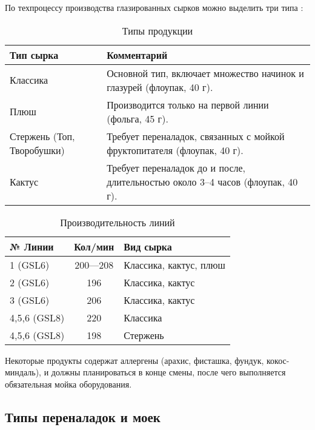 По техпроцессу производства глазированных сырков можно выделить три типа :
\begin{table}[h]
\centering
\caption{Типы продукции}
\begin{tabularx}{\textwidth}{|l|X|}
\hline
\textbf{Тип сырка} & \textbf{Комментарий} \\
\hline
Классика                   & Основной тип, включает множество начинок и глазурей (флоупак, 40 г). \\
\hline
Плюш                       & Производится только на первой линии (фольга, 45 г). \\
\hline
Стержень (Топ, Творобушки) & Требует переналадок, связанных с мойкой фруктопитателя (флоупак, 40 г). \\
\hline
Кактус                     & Требует переналадок до и после, длительностью около 3--4 часов (флоупак, 40 г). \\
\hline
\end{tabularx}
\end{table}

\begin{table}[h]
\centering
\caption{Производительность линий}
\begin{tabularx}{\textwidth}{|l|c|X|}
\hline
\textbf{№ Линии} & \textbf{ Кол/мин} & \textbf{Вид сырка} \\
\hline
1 (GSL6)     & 200—208 & Классика, кактус, плюш \\
\hline
2 (GSL6)     & 196     & Классика, кактус \\
\hline
3 (GSL6)     & 206     & Классика, кактус \\
\hline
4,5,6 (GSL8) & 220     & Классика \\
\hline
4,5,6 (GSL8) & 198     & Стержень \\
\hline
\end{tabularx}
\end{table}

Некоторые продукты содержат аллергены (арахис, фисташка, фундук, кокос-миндаль), и должны планироваться в конце смены, после чего выполняется обязательная мойка оборудования.

\subsection{Типы переналадок и моек}

